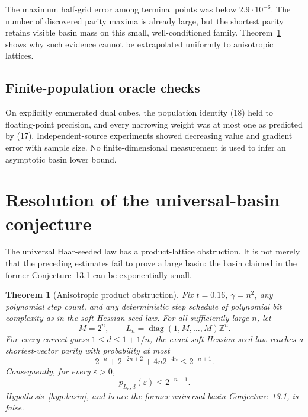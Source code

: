 \documentclass[10pt]{article}
\newtheorem{theorem}{Theorem}[section]
\theoremstyle{definition}
\newcommand{\Z}{\mathbb{Z}}
\begin{document}
The maximum half-grid error among terminal points was below $2.9\cdot10^{-6}$.
The number of discovered parity maxima is already large, but the shortest
parity retains visible basin mass on this small, well-conditioned family.
Theorem~\ref{thm:obstruction} shows why such evidence cannot be extrapolated
uniformly to anisotropic lattices.

\subsection{Finite-population oracle checks}

On explicitly enumerated dual cubes, the population identity (18) held to
floating-point precision, and every narrowing weight was at most one as
predicted by (17).  Independent-source experiments showed decreasing value
and gradient error with sample size.  No finite-dimensional measurement is
used to infer an asymptotic basin lower bound.

\section{Resolution of the universal-basin conjecture}

The universal Haar-seeded law has a product-lattice obstruction.  It is not
merely that the preceding estimates fail to prove a large basin: the basin
claimed in the former Conjecture~13.1 can be exponentially small.

\begin{theorem}[Anisotropic product obstruction]                  \label{thm:obstruction}
Fix $t=0.16$, $\gamma=n^2$, any polynomial step count, and any deterministic
step schedule of polynomial bit complexity as in the soft-Hessian seed law.
For all sufficiently large $n$, let
\[
 M=2^n,
 \qquad
 L_n=\operatorname{diag}(1,M,\ldots,M)\Z^n.                      \tag{35}
\]
For every correct guess $1\le d\le1+1/n$, the exact soft-Hessian seed law
reaches a shortest-vector parity with probability at most
\[
 2^{-n}+2^{-2n+2}+4n2^{-4n}\le2^{-n+1}.                          \tag{36}
\]
Consequently, for every $\varepsilon>0$,
\[
 p_{L_n,d}(\varepsilon)\le2^{-n+1}.                              \tag{37}
\]
Hypothesis~\ref{hyp:basin}, and hence the former universal-basin
Conjecture~13.1, is false.
\end{theorem}
\end{document}
